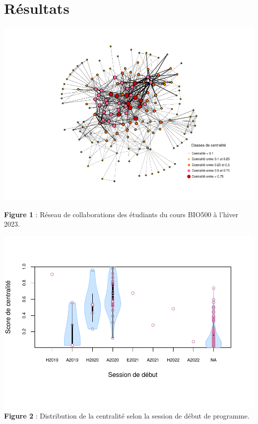 \documentclass[preprint, 3p,
authoryear]{elsarticle} %
\begin{document}
\hypertarget{ruxe9sultats}{%
\section{Résultats}\label{ruxe9sultats}}

\includegraphics{rapport_files/figure-latex/unnamed-chunk-1-1.pdf}

\textbf{Figure 1} : Réseau de collaborations des étudiants du cours
BIO500 à l'hiver 2023.

\includegraphics{rapport_files/figure-latex/unnamed-chunk-2-1.pdf}
\textbf{Figure 2} : Distribution de la centralité selon la session de
début de programme.
\end{document}
